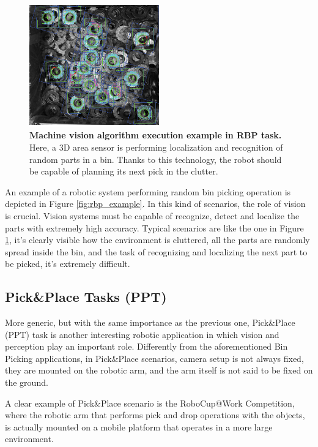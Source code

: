 \begin{figure}
    \centering
    \includegraphics[width=0.5\textwidth]{figures/1_perception_and_sensing_in_robotics/cluttered_env_rbp}
    \caption{\textbf{Machine vision algorithm execution example in RBP task.} Here, a 3D area sensor is performing localization and recognition of random parts in a bin. Thanks to this technology, the robot should be capable of planning its next pick in the clutter.} 
    \label{fig:cluttered_env_rbp}
\end{figure}

An example of a robotic system performing random bin picking operation is depicted in Figure \ref{fig:rbp_example}. In this kind of scenarios, the role of vision is crucial. Vision systems must be capable of recognize, detect and localize the parts with extremely high accuracy. Typical scenarios are like the one in Figure \ref{fig:cluttered_env_rbp}, it's clearly visible how the environment is cluttered, all the parts are randomly spread inside the bin, and the task of recognizing and localizing the next part to be picked, it's extremely difficult. 

\subsection{Pick\&Place Tasks (PPT)}\label{subsec:pickandplace}
More generic, but with the same importance as the previous one, Pick\&Place (PPT) task is another interesting robotic application in which vision and perception play an important role. Differently from the aforementioned Bin Picking applications, in Pick\&Place scenarios, camera setup is not always fixed, they are mounted on the robotic arm, and the arm itself is not said to be fixed on the ground. 

A clear example of Pick\&Place scenario is the RoboCup@Work Competition, where the robotic arm that performs pick and drop operations with the objects, is actually mounted on a mobile platform that operates in a more large environment.

